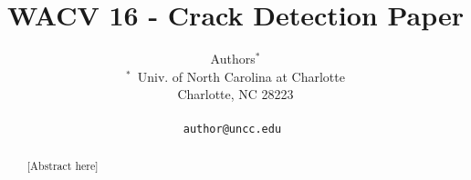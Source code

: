 \documentclass[10pt,twocolumn,letterpaper]{article}
\begin{document}
\title{WACV 16 - Crack Detection Paper}

\author{
Authors$^\ast$
\begin{tabular}{c c}
$^\ast$~Univ. of North Carolina at Charlotte \\
Charlotte, NC 28223\\
\end{tabular}\\
{\tt \small author@uncc.edu  } }
\maketitle

\begin{abstract}
[Abstract here]
\end{abstract}








\end{document}
